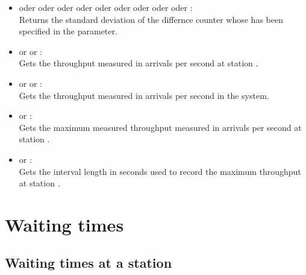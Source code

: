\begin{itemize}
\item
{} oder  oder  oder  oder  oder  oder  oder  oder  oder :\\
Returns the standard deviation of the differnce counter whose  has been specified in the parameter.

\item
{} or  or :\\
Gets the throughput measured in arrivals per second at station .

\item
{} or  or :\\
Gets the throughput measured in arrivals per second in the system.

\item
{} or :\\
Gets the maximum measured throughput measured in arrivals per second at station .

\item
{} or :\\
Gets the interval length in seconds used to record the maximum throughput at station .

\end{itemize}  



\section{Waiting times}



\subsection{Waiting times at a station}

